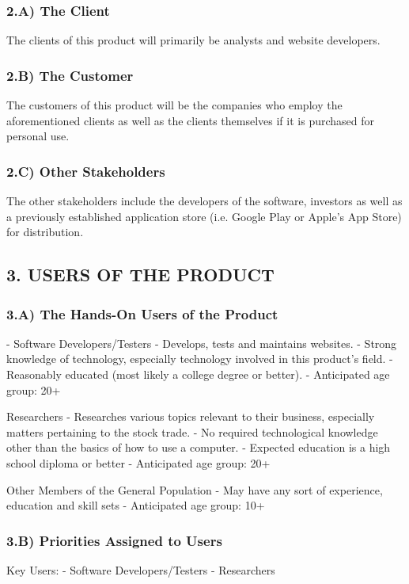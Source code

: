 \documentclass[12pt]{article}
\begin{document}
\subsubsection{2.A) The Client}
The clients of this product will primarily be analysts and website developers.

\subsubsection{2.B) The Customer}
The customers of this product will be the companies who employ the aforementioned clients as well as the clients themselves if it is purchased for personal use.

\subsubsection{2.C) Other Stakeholders}
The other stakeholders include the developers of the software, investors as well as a previously established application store (i.e. Google Play or Apple’s App Store) for distribution.

\subsection{3. USERS OF THE PRODUCT}

\subsubsection{3.A) The Hands-On Users of the Product}
- Software Developers/Testers
- Develops, tests and maintains websites.
- Strong knowledge of technology, especially technology involved in this product’s field.
- Reasonably educated (most likely a college degree or better).
- Anticipated age group: 20+

Researchers
- Researches various topics relevant to their business, especially matters pertaining to the stock trade.
- No required technological knowledge other than the basics of how to use a computer.
- Expected education is a high school diploma or better
- Anticipated age group: 20+

Other Members of the General Population
- May have any sort of experience, education and skill sets
- Anticipated age group: 10+


\subsubsection{3.B) Priorities Assigned to Users}
Key Users:
- Software Developers/Testers
- Researchers
\end{document}
